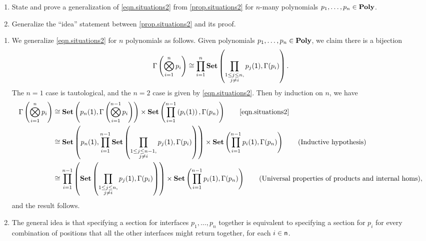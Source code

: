 \documentclass[Book-Poly]{subfiles}
\begin{document}
\begin{exercise}
\begin{enumerate}
	\item State and prove a generalization of \eqref{eqn.situations2} from \cref{prop.situations2} for $n$-many polynomials $p_1,\ldots,p_n\in\mathbf{Poly}$.
	\item Generalize the ``idea'' statement between \cref{prop.situations2} and its proof.
\qedhere
\end{enumerate}
\begin{solution}
\begin{enumerate}
    \item We generalize \eqref{eqn.situations2} for $n$ polynomials as follows.
    Given polynomials $p_1,\ldots,p_n\in\mathbf{Poly}$, we claim there is a bijection
    \[
        \Gamma\left(\bigotimes_{i=1}^n p_i \right) \cong \prod_{i=1}^n \mathbf{Set}\left(\prod_{\substack{1 \leq j \leq n, \\ j \neq i}} p_j(\textsf{1}), \Gamma(p_i)\right).
    \]
    The $n=1$ case is tautological, and the $n=2$ case is given by \eqref{eqn.situations2}.
    Then by induction on $n$, we have
    \begin{align*}
        \Gamma\left(\bigotimes_{i=1}^n p_i \right) &\iso \smset\left(p_n(\1), \Gamma\left(\bigotimes_{i=1}^{n-1} p_i \right)\right) \times \smset\left(\prod_{i=1}^{n-1}\left(p_i(\1)\right), \Gamma(p_n)\right) \tag*{\eqref{eqn.situations2}} \\
        &\iso \smset\left(p_n(\1), \prod_{i=1}^{n-1} \smset\left(\prod_{\substack{1 \leq j \leq n-1, \\ j \neq i}} p_j(\1), \Gamma(p_i)\right)\right) \times \smset\left(\prod_{i=1}^{n-1} p_i(\1), \Gamma(p_n)\right) \tag{Inductive hypothesis} \\
        &\iso \prod_{i=1}^{n-1}\left( \smset\left(\prod_{\substack{1 \leq j \leq n, \\ j \neq i}} p_j(\1), \Gamma(p_i)\right)\right) \times \smset\left(\prod_{i=1}^{n-1} p_i(\1), \Gamma(p_n)\right) \tag{Universal properties of products and internal homs},
    \end{align*}
    and the result follows.
    \item The general idea is that specifying a section for interfaces $p_1,\ldots,p_n$ together is equivalent to specifying a section for $p_i$ for every combination of positions that all the other interfaces might return together, for each $i\in\mathsf{n}$.
\end{enumerate}
\end{solution}
\end{exercise}
\end{document}
